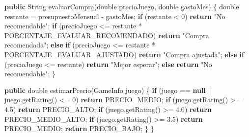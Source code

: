 \documentclass[
  spanish,
  11pt,
  paper=a4,
  ,captions=tableheading
]{scrartcl}
\newenvironment{Shaded}{}{}
\newcommand{\BuiltInTok}[1]{\textcolor[rgb]{0.00,0.50,0.00}{#1}}
\newcommand{\ControlFlowTok}[1]{\textcolor[rgb]{0.00,0.44,0.13}{\textbf{#1}}}
\newcommand{\DataTypeTok}[1]{\textcolor[rgb]{0.56,0.13,0.00}{#1}}
\newcommand{\DecValTok}[1]{\textcolor[rgb]{0.25,0.63,0.44}{#1}}
\newcommand{\FloatTok}[1]{\textcolor[rgb]{0.25,0.63,0.44}{#1}}
\newcommand{\FunctionTok}[1]{\textcolor[rgb]{0.02,0.16,0.49}{#1}}
\newcommand{\KeywordTok}[1]{\textcolor[rgb]{0.00,0.44,0.13}{\textbf{#1}}}
\newcommand{\NormalTok}[1]{#1}
\newcommand{\OperatorTok}[1]{\textcolor[rgb]{0.40,0.40,0.40}{#1}}
\newcommand{\StringTok}[1]{\textcolor[rgb]{0.25,0.44,0.63}{#1}}
\begin{document}
\begin{Shaded}
\begin{Highlighting}[]
    \KeywordTok{public} \BuiltInTok{String} \FunctionTok{evaluarCompra}\OperatorTok{(}\DataTypeTok{double}\NormalTok{ precioJuego}\OperatorTok{,} \DataTypeTok{double}\NormalTok{ gastoMes}\OperatorTok{)} \OperatorTok{\{}
        \DataTypeTok{double}\NormalTok{ restante }\OperatorTok{=}\NormalTok{ presupuestoMensual }\OperatorTok{{-}}\NormalTok{ gastoMes}\OperatorTok{;}
        \ControlFlowTok{if} \OperatorTok{(}\NormalTok{restante }\OperatorTok{\textless{}} \DecValTok{0}\OperatorTok{)} \ControlFlowTok{return} \StringTok{"No recomendable"}\OperatorTok{;}
        \ControlFlowTok{if} \OperatorTok{(}\NormalTok{precioJuego }\OperatorTok{\textless{}=}\NormalTok{ restante }\OperatorTok{*}\NormalTok{ PORCENTAJE\_EVALUAR\_RECOMENDADO}\OperatorTok{)}
            \ControlFlowTok{return} \StringTok{"Compra recomendada"}\OperatorTok{;}
        \ControlFlowTok{else} \ControlFlowTok{if} \OperatorTok{(}\NormalTok{precioJuego }\OperatorTok{\textless{}=}\NormalTok{ restante }\OperatorTok{*}\NormalTok{ PORCENTAJE\_EVALUAR\_AJUSTADO}\OperatorTok{)}
            \ControlFlowTok{return} \StringTok{"Compra ajustada"}\OperatorTok{;}
        \ControlFlowTok{else} \ControlFlowTok{if} \OperatorTok{(}\NormalTok{precioJuego }\OperatorTok{\textless{}=}\NormalTok{ restante}\OperatorTok{)}
            \ControlFlowTok{return} \StringTok{"Mejor esperar"}\OperatorTok{;}
        \ControlFlowTok{else}
            \ControlFlowTok{return} \StringTok{"No recomendable"}\OperatorTok{;}
    \OperatorTok{\}}

    \KeywordTok{public} \DataTypeTok{double} \FunctionTok{estimarPrecio}\OperatorTok{(}\NormalTok{GameInfo juego}\OperatorTok{)} \OperatorTok{\{}
        \ControlFlowTok{if} \OperatorTok{(}\NormalTok{juego }\OperatorTok{==} \KeywordTok{null} \OperatorTok{||}\NormalTok{ juego}\OperatorTok{.}\FunctionTok{getRating}\OperatorTok{()} \OperatorTok{\textless{}=} \DecValTok{0}\OperatorTok{)} \ControlFlowTok{return}\NormalTok{ PRECIO\_MEDIO}\OperatorTok{;}
        \ControlFlowTok{if} \OperatorTok{(}\NormalTok{juego}\OperatorTok{.}\FunctionTok{getRating}\OperatorTok{()} \OperatorTok{\textgreater{}=} \FloatTok{4.5}\OperatorTok{)} \ControlFlowTok{return}\NormalTok{ PRECIO\_ALTO}\OperatorTok{;}
        \ControlFlowTok{if} \OperatorTok{(}\NormalTok{juego}\OperatorTok{.}\FunctionTok{getRating}\OperatorTok{()} \OperatorTok{\textgreater{}=} \FloatTok{4.0}\OperatorTok{)} \ControlFlowTok{return}\NormalTok{ PRECIO\_MEDIO\_ALTO}\OperatorTok{;}
        \ControlFlowTok{if} \OperatorTok{(}\NormalTok{juego}\OperatorTok{.}\FunctionTok{getRating}\OperatorTok{()} \OperatorTok{\textgreater{}=} \FloatTok{3.5}\OperatorTok{)} \ControlFlowTok{return}\NormalTok{ PRECIO\_MEDIO}\OperatorTok{;}
        \ControlFlowTok{return}\NormalTok{ PRECIO\_BAJO}\OperatorTok{;}
    \OperatorTok{\}}
\OperatorTok{\}}
\end{Highlighting}
\end{Shaded}
\end{document}
